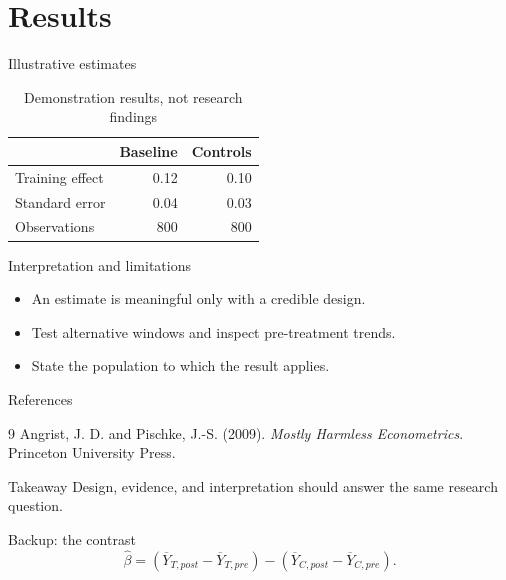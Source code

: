 \documentclass[aspectratio=169]{beamer}
\begin{document}
\section{Results}
\begin{frame}{Illustrative estimates}
\centering
\begin{table}
\caption{Demonstration results, not research findings}
\begin{tabular}{lrr}
\toprule & Baseline & Controls \\
\midrule Training effect & 0.12 & 0.10 \\
Standard error & 0.04 & 0.03 \\
Observations & 800 & 800 \\
\bottomrule
\end{tabular}
\end{table}
\medskip
{}
\end{frame}
\begin{frame}{Interpretation and limitations}
\begin{itemize}
\item An estimate is meaningful only with a credible design.
\item Test alternative windows and inspect pre-treatment trends.
\item State the population to which the result applies.
\end{itemize}
\end{frame}
\begin{frame}{References}
\begin{thebibliography}{9}
 Angrist, J. D. and Pischke, J.-S. (2009).
\newblock \emph{Mostly Harmless Econometrics}. Princeton University Press.
\end{thebibliography}
\end{frame}
\begin{frame}{Takeaway}
Design, evidence, and interpretation should answer the same research question.
\end{frame}
\appendix
\begin{frame}{Backup: the contrast}
\[\widehat\beta=(\overline Y_{T,post}-\overline Y_{T,pre})-(\overline Y_{C,post}-\overline Y_{C,pre}).\]
\end{frame}
\end{document}

